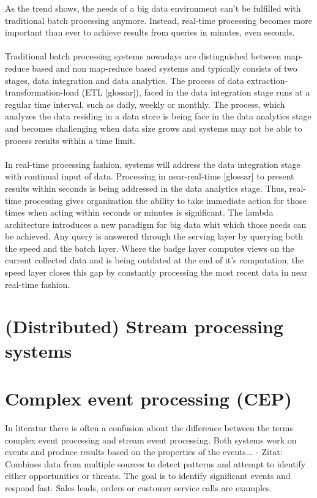 As the trend shows, the needs of a big data environment can't be fulfilled with 
traditional batch processing anymore. Instead, real-time processing becomes more 
important than ever to achieve results from queries in minutes, even seconds. 
\cite{bange2013big}
\\ \\
Traditional batch processing systems nowadays are distinguished between
map-reduce based and non map-reduce based systems and typically consists of two
stages, data integration and data analytics. The process of data
extraction-transformation-load (ETL [glossar]), faced in the data integration stage runs
at a regular time interval, such as daily, weekly or monthly. The process, which
analyzes the data residing in a data store is being face in the data analytics
stage and becomes challenging when data size grows and systems may not be able
to process results within a time limit.\cite{Liu:2014:SRP:2628194.2628251}
\\ \\
In real-time processing fashion, systems will address the data integration stage
with continual input of data. Processing in near-real-time [glossar] to present 
results within seconds is being addressed in the data analytics stage. Thus,
real-time processing gives organization the ability to take immediate action
for those times when acting within seconds or minutes is significant.
\cite{PrpSvyOfDSPS}
The lambda architecture introduces a new
paradigm for big data whit which those needs can be achieved. Any query is
answered through the serving layer by querying both the speed and the batch
layer. Where the badge layer computes views on the current collected data and
is being outdated at the end of it's computation, the speed layer closes this 
gap by constantly processing the most recent data in near real-time fashion. 
\cite{marz2015big}
\\


\section{(Distributed) Stream processing systems}

\section{Complex event processing (CEP)}
In literatur there is often a confusion about the difference between the terms
complex event processing and stream event processing. Both systems work on
events and produce results based on the properties of the events... 
- Zitat: Combines data from multiple sources  to detect patterns and attempt to
identify either opportunities or threats. The goal is to identify significant
events and respond fast. Sales leads, orders or customer service calls are
examples.\\



